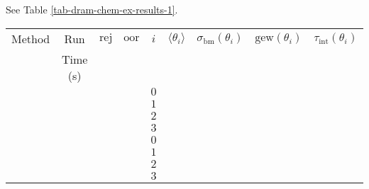 See Table \ref{tab-dram-chem-ex-results-1}.

\begin{table}[h!]
\begin{center}
\begin{tabular}{|c|c|c|c|c|c|c|c|c|}
\hline
Method & Run      & $\text{rej}$           & $\text{oor}$           & $i$ & $\langle\theta_i\rangle$ & $\sigma_{\text{bm}}(\theta_i)$ & $\text{gew}(\theta_i)$ & $\tau_{\text{int}}(\theta_i)$ \\
       & Time (s) &                        &                        &     &                          &                                &                        &                               \\
\hline
\hline
       &          &                        &                        & $0$ &                          &                                &                        &                               \\
\cline{5-9}
       &          &                        &                        & $1$ &                          &                                &                        &                               \\
\cline{5-9}
       &          &                        &                        & $2$ &                          &                                &                        &                               \\
\cline{5-9}
       &          &                        &                        & $3$ &                          &                                &                        &                               \\
\hline
\hline
       &          &                        &                        & $0$ &                          &                                &                        &                               \\
\cline{5-9}
       &          &                        &                        & $1$ &                          &                                &                        &                               \\
\cline{5-9}
       &          &                        &                        & $2$ &                          &                                &                        &                               \\
\cline{5-9}
       &          &                        &                        & $3$ &                          &                                &                        &                               \\

\end{tabular}
\end{center}
\end{table}
